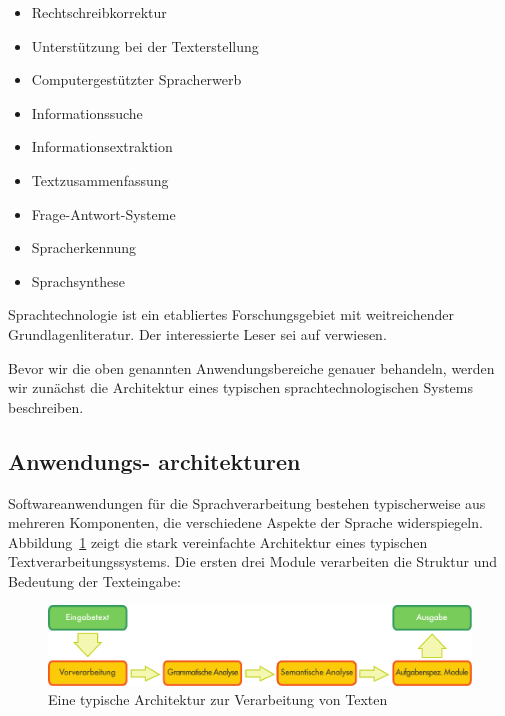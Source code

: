 \documentclass[]{../../metanetpaper}
\begin{document}
\begin{multicols}{2}
\begin{itemize}
\item Rechtschreibkorrektur
\item Unterstützung bei der Texterstellung
\item Computergestützter Spracherwerb
\item Informationssuche
\item Informationsextraktion
\item Textzusammenfassung
\item Frage-Antwort-Systeme
\item Spracherkennung 
\item Sprachsynthese
\end{itemize}

Sprachtechnologie ist ein etabliertes Forschungsgebiet mit weitreichender Grundlagenliteratur. Der interessierte Leser sei auf \cite{carstensen-etal1, jurafsky-martin01, manning-schuetze1, lt-world1, lt-survey1} verwiesen.

Bevor wir die oben genannten Anwendungsbereiche genauer behandeln, werden wir zunächst die Architektur eines typischen sprachtechnologischen Systems beschreiben. 

\subsection[Anwendungsarchitekturen]{Anwendungs- architekturen}

Softwareanwendungen für die Sprachverarbeitung bestehen typischerweise aus mehreren Komponenten, die verschiedene Aspekte der Sprache widerspiegeln. Abbildung~\ref{fig:textprocessingarch_de} zeigt die stark vereinfachte Architektur eines typischen Textverarbeitungssystems. Die ersten drei Module verarbeiten die Struktur und Bedeutung der Texteingabe:

\begin{figure}[b]
  \center
  \vspace{-5mm} \includegraphics[width=\textwidth]{../_media/german/text_processing_app_architecture}
  \caption{Eine typische Architektur zur Verarbeitung von Texten}
  \label{fig:textprocessingarch_de}
\end{figure}


\end{multicols}
\end{document}
